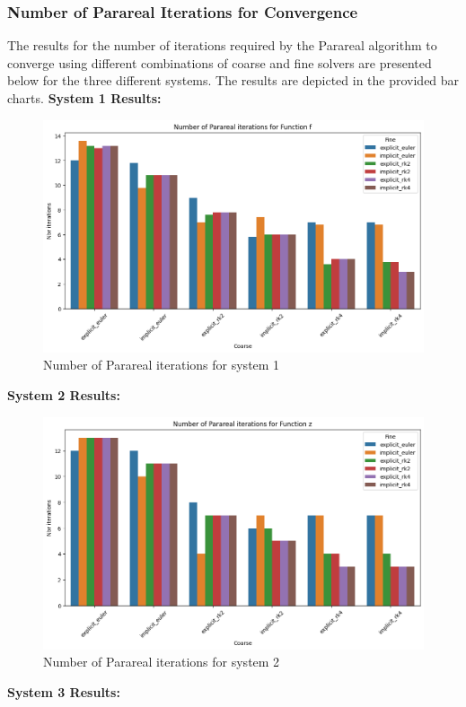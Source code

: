\documentclass[a4paper,12pt,french]{article}
\begin{document}
\subsubsection{Number of Parareal Iterations for Convergence}
The results for the number of iterations required by the Parareal algorithm to converge using different combinations of coarse and fine solvers are presented below for the three different systems. The results are depicted in the provided bar charts.
\newline
\newline
\textbf{System 1 Results:}
\begin{figure}[ht!]
    \centering
    \includegraphics[width=.85\textwidth]{img/nbr_iter_f.png}
    \caption{Number of Parareal iterations for system 1}
    \label{fig:1}
\end{figure}
\newpage
\textbf{System 2 Results:}
\begin{figure}[ht!]
    \centering
    \includegraphics[width=.85\textwidth]{img/nbr_iter_z.png}
    \caption{Number of Parareal iterations for system 2}
    \label{fig:2}
\end{figure}
\newline
\textbf{System 3 Results:}
\end{document}
